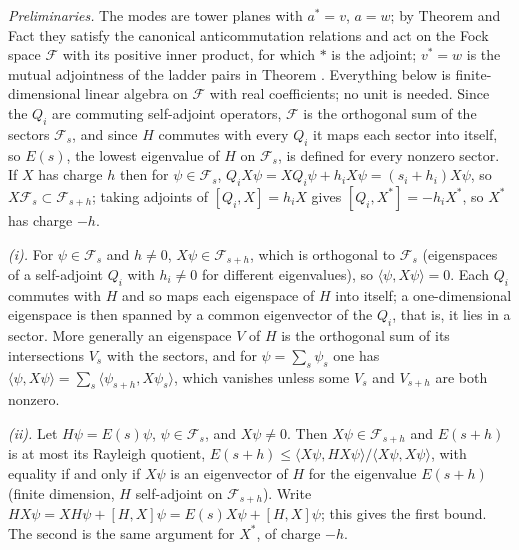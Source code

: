 \emph{Preliminaries.} The modes are tower planes with $a^{*} = v$, $a = w$; by Theorem  and Fact  they satisfy the canonical anticommutation relations and act on the Fock space $\mathcal{F}$ with its positive inner product, for which $*$ is the adjoint; $v^{*} = w$ is the mutual adjointness of the ladder pairs in Theorem . Everything below is finite-dimensional linear algebra on $\mathcal{F}$ with real coefficients; no unit is needed. Since the $Q_{i}$ are commuting self-adjoint operators, $\mathcal{F}$ is the orthogonal sum of the sectors $\mathcal{F}_{s}$, and since $H$ commutes with every $Q_{i}$ it maps each sector into itself, so $E(s)$, the lowest eigenvalue of $H$ on $\mathcal{F}_{s}$, is defined for every nonzero sector. If $X$ has charge $h$ then for $\psi \in \mathcal{F}_{s}$, $Q_{i}X\psi = XQ_{i}\psi + h_{i}X\psi = (s_{i} + h_{i})X\psi$, so $X\mathcal{F}_{s} \subset \mathcal{F}_{s+h}$; taking adjoints of $[Q_{i}, X] = h_{i}X$ gives $[Q_{i}, X^{*}] = -h_{i}X^{*}$, so $X^{*}$ has charge $-h$.

\emph{(i).} For $\psi \in \mathcal{F}_{s}$ and $h \ne 0$, $X\psi \in \mathcal{F}_{s+h}$, which is orthogonal to $\mathcal{F}_{s}$ (eigenspaces of a self-adjoint $Q_{i}$ with $h_{i} \ne 0$ for different eigenvalues), so $\langle\psi, X\psi\rangle = 0$. Each $Q_{i}$ commutes with $H$ and so maps each eigenspace of $H$ into itself; a one-dimensional eigenspace is then spanned by a common eigenvector of the $Q_{i}$, that is, it lies in a sector. More generally an eigenspace $V$ of $H$ is the orthogonal sum of its intersections $V_{s}$ with the sectors, and for $\psi = \sum_{s}\psi_{s}$ one has $\langle\psi, X\psi\rangle = \sum_{s}\langle\psi_{s+h}, X\psi_{s}\rangle$, which vanishes unless some $V_{s}$ and $V_{s+h}$ are both nonzero.

\emph{(ii).} Let $H\psi = E(s)\psi$, $\psi \in \mathcal{F}_{s}$, and $X\psi \ne 0$. Then $X\psi \in \mathcal{F}_{s+h}$ and $E(s+h)$ is at most its Rayleigh quotient, $E(s+h) \le \langle X\psi, HX\psi\rangle/\langle X\psi, X\psi\rangle$, with equality if and only if $X\psi$ is an eigenvector of $H$ for the eigenvalue $E(s+h)$ (finite dimension, $H$ self-adjoint on $\mathcal{F}_{s+h}$). Write $HX\psi = XH\psi + [H, X]\psi = E(s)X\psi + [H, X]\psi$; this gives the first bound. The second is the same argument for $X^{*}$, of charge $-h$.

